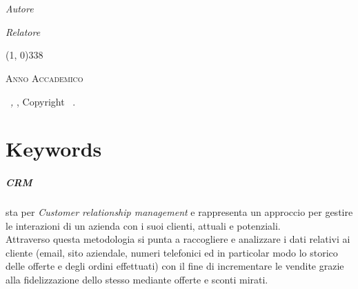 \documentclass[12pt,a4paper,twoside,openright,english]{book}
\begin{document}
\begin{titlepage}
\begin{center}
		\LARGE{\textsc{\textbf{\myTitle}}}\\
		\large{\mySubTitle}\\
		\vfill
		\begin{minipage}{0.4\textwidth}
			\begin{flushleft} \large
				\emph{Autore}\\
				\myName
			\end{flushleft}
		\end{minipage}
		\hfill
		\begin{minipage}{0.4\textwidth}
			\begin{flushright} \large
				\emph{Relatore} \\
				\myProf
			\end{flushright}
		\end{minipage}
		\vfill
		\line(1, 0){338} \\
		\begin{normalsize}
			\textsc{Anno Accademico \myAA}
		\end{normalsize}
	\end{center}
\end{titlepage}

\thispagestyle{empty}
\hfill
\vfill
\noindent \myName\ \textit{\myTitle,} \myDegree, Copyright \textcopyright\ \myTime.

\cleardoublepage


\chapter*{Keywords}\label{keywords}
\paragraph*{CRM}
sta per \textit{Customer relationship management} e rappresenta un approccio per gestire le interazioni di un azienda con i suoi clienti, attuali e potenziali.\\
Attraverso questa metodologia si punta a raccogliere e analizzare i dati relativi ai cliente (email, sito aziendale, numeri telefonici ed in particolar modo lo storico delle offerte e degli ordini effettuati) con il fine di incrementare le vendite grazie alla fidelizzazione dello stesso mediante offerte e sconti mirati.\\
 
\end{document}
